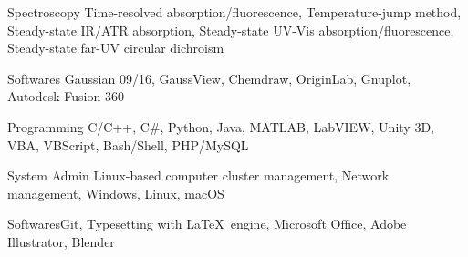 

\begin{cvskills}


\cvskill
{Spectroscopy} %
{Time-resolved absorption/fluorescence, Temperature-jump method, Steady-state IR/ATR absorption, Steady-state UV-Vis absorption/fluorescence, Steady-state far-UV circular dichroism} %


\cvskill
{Softwares}
{Gaussian 09/16, GaussView, Chemdraw, OriginLab, Gnuplot, Autodesk Fusion 360}


\end{cvskills}


\begin{cvskills}


\cvskill
{Programming}
{C/C++, C\#, Python, Java, MATLAB, LabVIEW, Unity 3D, VBA, VBScript, Bash/Shell, PHP/MySQL}




\cvskill
{System Admin}
{Linux-based computer cluster management, Network management, Windows, Linux, macOS}


\cvskill
{Softwares}{Git, Typesetting with \LaTeX\ engine, Microsoft Office, Adobe Illustrator, Blender}


\end{cvskills}